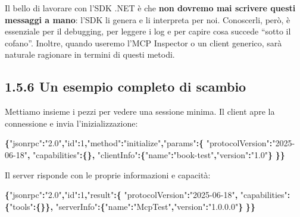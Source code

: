 \documentclass[
  italian,
  10pt,
]{book}
\newenvironment{Shaded}{\begin{snugshade}}{\end{snugshade}}
\newcommand{\DataTypeTok}[1]{\textcolor[rgb]{0.13,0.29,0.53}{#1}}
\newcommand{\DecValTok}[1]{\textcolor[rgb]{0.00,0.00,0.81}{#1}}
\newcommand{\FunctionTok}[1]{\textcolor[rgb]{0.13,0.29,0.53}{\textbf{#1}}}
\newcommand{\StringTok}[1]{\textcolor[rgb]{0.31,0.60,0.02}{#1}}
\begin{document}
Il bello di lavorare con l'SDK .NET è che \textbf{non dovremo mai
scrivere questi messaggi a mano}: l'SDK li genera e li interpreta per
noi. Conoscerli, però, è essenziale per il debugging, per leggere i log
e per capire cosa succede ``sotto il cofano''. Inoltre, quando useremo
l'MCP Inspector o un client generico, sarà naturale ragionare in termini
di questi metodi.

\subsection{1.5.6 Un esempio completo di
scambio}\label{un-esempio-completo-di-scambio}

Mettiamo insieme i pezzi per vedere una sessione minima. Il client apre
la connessione e invia l'inizializzazione:

\begin{Shaded}
\begin{Highlighting}[]
\FunctionTok{\{}\DataTypeTok{"jsonrpc"}\FunctionTok{:}\StringTok{"2.0"}\FunctionTok{,}\DataTypeTok{"id"}\FunctionTok{:}\DecValTok{1}\FunctionTok{,}\DataTypeTok{"method"}\FunctionTok{:}\StringTok{"initialize"}\FunctionTok{,}\DataTypeTok{"params"}\FunctionTok{:\{}
  \DataTypeTok{"protocolVersion"}\FunctionTok{:}\StringTok{"2025{-}06{-}18"}\FunctionTok{,}
  \DataTypeTok{"capabilities"}\FunctionTok{:\{\},}
  \DataTypeTok{"clientInfo"}\FunctionTok{:\{}\DataTypeTok{"name"}\FunctionTok{:}\StringTok{"book{-}test"}\FunctionTok{,}\DataTypeTok{"version"}\FunctionTok{:}\StringTok{"1.0"}\FunctionTok{\}}
\FunctionTok{\}\}}
\end{Highlighting}
\end{Shaded}

Il server risponde con le proprie informazioni e capacità:

\begin{Shaded}
\begin{Highlighting}[]
\FunctionTok{\{}\DataTypeTok{"jsonrpc"}\FunctionTok{:}\StringTok{"2.0"}\FunctionTok{,}\DataTypeTok{"id"}\FunctionTok{:}\DecValTok{1}\FunctionTok{,}\DataTypeTok{"result"}\FunctionTok{:\{}
  \DataTypeTok{"protocolVersion"}\FunctionTok{:}\StringTok{"2025{-}06{-}18"}\FunctionTok{,}
  \DataTypeTok{"capabilities"}\FunctionTok{:\{}\DataTypeTok{"tools"}\FunctionTok{:\{\}\},}
  \DataTypeTok{"serverInfo"}\FunctionTok{:\{}\DataTypeTok{"name"}\FunctionTok{:}\StringTok{"McpTest"}\FunctionTok{,}\DataTypeTok{"version"}\FunctionTok{:}\StringTok{"1.0.0.0"}\FunctionTok{\}}
\FunctionTok{\}\}}
\end{Highlighting}
\end{Shaded}
\end{document}

